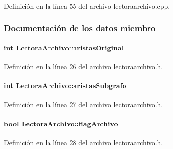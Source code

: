 Definición en la línea 55 del archivo lectoraarchivo.\-cpp.



\subsubsection{Documentación de los datos miembro}
\hypertarget{class_lectora_archivo_a466143a1c460bd6ec8cc0f8938c4342d}{
\paragraph[{aristas\-Original}]{\setlength{\rightskip}{0pt plus 5cm}int Lectora\-Archivo\-::aristas\-Original\hspace{0.3cm}{\ttfamily [private]}}}\label{class_lectora_archivo_a466143a1c460bd6ec8cc0f8938c4342d}


Definición en la línea 26 del archivo lectoraarchivo.\-h.

\hypertarget{class_lectora_archivo_aa72a45703b6dc1c492e2dccd27ba7645}{
\paragraph[{aristas\-Subgrafo}]{\setlength{\rightskip}{0pt plus 5cm}int Lectora\-Archivo\-::aristas\-Subgrafo\hspace{0.3cm}{\ttfamily [private]}}}\label{class_lectora_archivo_aa72a45703b6dc1c492e2dccd27ba7645}


Definición en la línea 27 del archivo lectoraarchivo.\-h.

\hypertarget{class_lectora_archivo_a7843bade2641571159e4b92a48ded4af}{
\paragraph[{flag\-Archivo}]{\setlength{\rightskip}{0pt plus 5cm}bool Lectora\-Archivo\-::flag\-Archivo\hspace{0.3cm}{\ttfamily [private]}}}\label{class_lectora_archivo_a7843bade2641571159e4b92a48ded4af}


Definición en la línea 28 del archivo lectoraarchivo.\-h.

